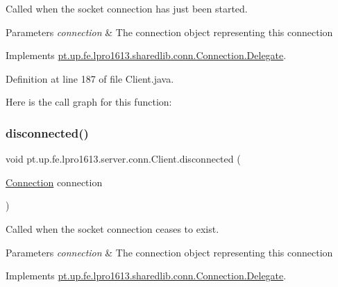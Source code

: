 Called when the socket connection has just been started.


\begin{DoxyParams}{Parameters}
{\em connection} & The connection object representing this connection \\
\hline
\end{DoxyParams}


Implements \hyperlink{interfacept_1_1up_1_1fe_1_1lpro1613_1_1sharedlib_1_1conn_1_1_connection_1_1_delegate_afeb3c54ced46916733df2ba0b0e2d87e}{pt.\+up.\+fe.\+lpro1613.\+sharedlib.\+conn.\+Connection.\+Delegate}.



Definition at line 187 of file Client.\+java.

Here is the call graph for this function\+:
\hypertarget{classpt_1_1up_1_1fe_1_1lpro1613_1_1server_1_1conn_1_1_client_a8aaec34bb1c5d5af0430318b105ac3fc}{}\label{classpt_1_1up_1_1fe_1_1lpro1613_1_1server_1_1conn_1_1_client_a8aaec34bb1c5d5af0430318b105ac3fc} 
\subsubsection{\texorpdfstring{disconnected()}{disconnected()}}
{\footnotesize\ttfamily void pt.\+up.\+fe.\+lpro1613.\+server.\+conn.\+Client.\+disconnected (\begin{DoxyParamCaption}\item[{\hyperlink{classpt_1_1up_1_1fe_1_1lpro1613_1_1sharedlib_1_1conn_1_1_connection}{Connection}}]{connection }\end{DoxyParamCaption})}

Called when the socket connection ceases to exist.


\begin{DoxyParams}{Parameters}
{\em connection} & The connection object representing this connection \\
\hline
\end{DoxyParams}


Implements \hyperlink{interfacept_1_1up_1_1fe_1_1lpro1613_1_1sharedlib_1_1conn_1_1_connection_1_1_delegate_a39547a28a5b1818ca952e8d3d8da15ba}{pt.\+up.\+fe.\+lpro1613.\+sharedlib.\+conn.\+Connection.\+Delegate}.



